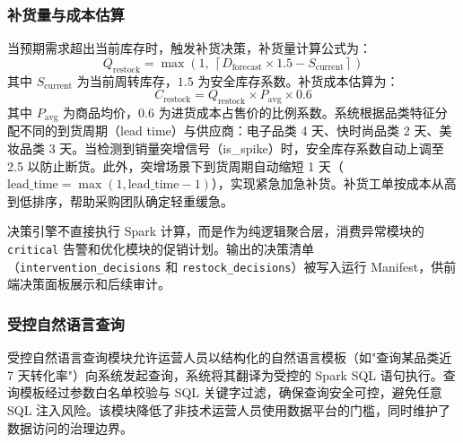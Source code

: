 \subsubsection{补货量与成本估算}

当预期需求超出当前库存时，触发补货决策，补货量计算公式为：
\begin{equation}
    Q_{\text{restock}} = \max\left(1,\ \left\lceil D_{\text{forecast}} \times 1.5 - S_{\text{current}} \right\rceil\right)
    \label{eq:restock-qty}
\end{equation}
其中 $S_{\text{current}}$ 为当前周转库存，$1.5$ 为安全库存系数。补货成本估算为：
\begin{equation}
    C_{\text{restock}} = Q_{\text{restock}} \times P_{\text{avg}} \times 0.6
    \label{eq:restock-cost}
\end{equation}
其中 $P_{\text{avg}}$ 为商品均价，$0.6$ 为进货成本占售价的比例系数。系统根据品类特征分配不同的到货周期（lead time）与供应商：电子品类 4 天、快时尚品类 2 天、美妆品类 3 天。当检测到销量突增信号（is\_spike）时，安全库存系数自动上调至 2.5 以防止断货。此外，突增场景下到货周期自动缩短 1 天（$\text{lead\_time} = \max(1, \text{lead\_time} - 1)$），实现紧急加急补货。补货工单按成本从高到低排序，帮助采购团队确定轻重缓急。

决策引擎不直接执行 Spark 计算，而是作为纯逻辑聚合层，消费异常模块的 \texttt{critical} 告警和优化模块的促销计划。输出的决策清单（\texttt{intervention\_decisions} 和 \texttt{restock\_decisions}）被写入运行 Manifest，供前端决策面板展示和后续审计。

\subsubsection{受控自然语言查询}

受控自然语言查询模块允许运营人员以结构化的自然语言模板（如"查询某品类近 7 天转化率"）向系统发起查询，系统将其翻译为受控的 Spark SQL 语句执行。查询模板经过参数白名单校验与 SQL 关键字过滤，确保查询安全可控，避免任意 SQL 注入风险。该模块降低了非技术运营人员使用数据平台的门槛，同时维护了数据访问的治理边界。

